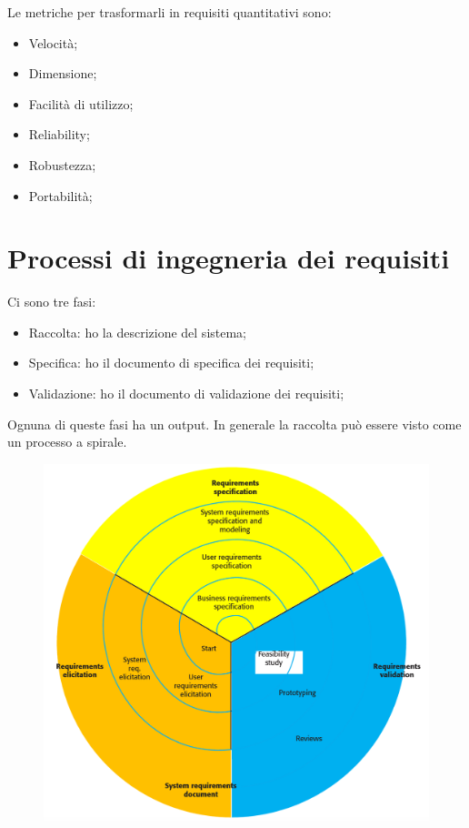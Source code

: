 Le metriche per trasformarli in requisiti quantitativi sono:
\begin{itemize}
    \item Velocità;
    \item Dimensione;
    \item Facilità di utilizzo;
    \item Reliability;
    \item Robustezza;
    \item Portabilità;
\end{itemize}
\section{Processi di ingegneria dei requisiti}
Ci sono tre fasi:
\begin{itemize}
    \item Raccolta: ho la descrizione del sistema;
    \item Specifica: ho il documento di specifica dei requisiti;
    \item Validazione: ho il documento di validazione dei requisiti;
\end{itemize}
Ognuna di queste fasi ha un output. In generale la raccolta può essere visto 
come un processo  a spirale.
\begin{figure}[H]
    \centering
    \includegraphics[scale=0.4]{img/spiralerequisiti.png}
\end{figure}
